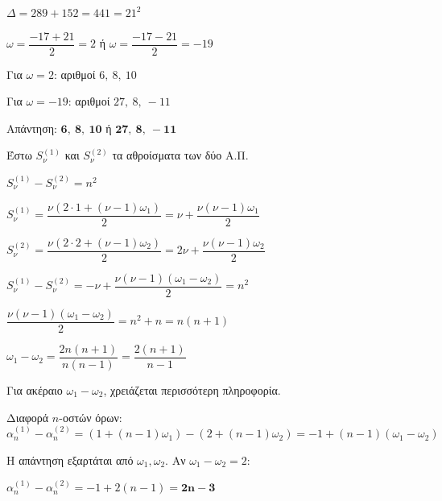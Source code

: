 \documentclass[11pt,a4paper,modern]{FFExercises}
\begin{document}
$\varDelta=289+152=441=21^2$

$\omega=\dfrac{-17+21}{2}=2$ ή $\omega=\dfrac{-17-21}{2}=-19$

Για $\omega=2$: αριθμοί $6,\ 8,\ 10$

Για $\omega=-19$: αριθμοί $27,\ 8,\ -11$

Απάντηση: $\boldsymbol{6,\ 8,\ 10}$ ή $\boldsymbol{27,\ 8,\ -11}$

\lysh[53]
Έστω $S_{\nu}^{(1)}$ και $S_{\nu}^{(2)}$ τα αθροίσματα των δύο Α.Π.

$S_{\nu}^{(1)}-S_{\nu}^{(2)}=n^2$

$S_{\nu}^{(1)}=\dfrac{\nu(2\cdot 1+(\nu-1)\omega_1)}{2}=\nu+\dfrac{\nu(\nu-1)\omega_1}{2}$

$S_{\nu}^{(2)}=\dfrac{\nu(2\cdot 2+(\nu-1)\omega_2)}{2}=2\nu+\dfrac{\nu(\nu-1)\omega_2}{2}$

$S_{\nu}^{(1)}-S_{\nu}^{(2)}=-\nu+\dfrac{\nu(\nu-1)(\omega_1-\omega_2)}{2}=n^2$

$\dfrac{\nu(\nu-1)(\omega_1-\omega_2)}{2}=n^2+n=n(n+1)$

$\omega_1-\omega_2=\dfrac{2n(n+1)}{n(n-1)}=\dfrac{2(n+1)}{n-1}$

Για ακέραιο $\omega_1-\omega_2$, χρειάζεται περισσότερη πληροφορία.

Διαφορά $n$-οστών όρων:
$\alpha_n^{(1)}-\alpha_n^{(2)}=(1+(n-1)\omega_1)-(2+(n-1)\omega_2)=-1+(n-1)(\omega_1-\omega_2)$

Η απάντηση εξαρτάται από $\omega_1,\omega_2$. Αν $\omega_1-\omega_2=2$:

$\alpha_n^{(1)}-\alpha_n^{(2)}=-1+2(n-1)=\boldsymbol{2n-3}$
\end{document}
